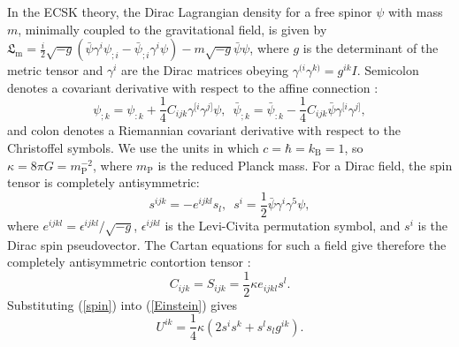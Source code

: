 \documentclass[prd,onecolumn,nofootinbib,showpacs]{revtex4}
\begin{document}
In the ECSK theory, the Dirac Lagrangian density for a free spinor $\psi$ with mass $m$, minimally coupled to the gravitational field, is given by $\mathfrak{L}_\textrm{m}=\frac{i}{2}\sqrt{-g}(\bar{\psi}\gamma^i\psi_{;i}-\bar{\psi}_{;i}\gamma^i\psi)-m\sqrt{-g}\bar{\psi}\psi$, where $g$ is the determinant of the metric tensor and $\gamma^i$ are the Dirac matrices obeying $\gamma^{(i}\gamma^{k)}=g^{ik}I$.
Semicolon denotes a covariant derivative with respect to the affine connection \cite{KS,Hehl}:
\begin{equation}
\psi_{;k}=\psi_{:k}+\frac{1}{4}C_{ijk}\gamma^{[i}\gamma^{j]}\psi,\,\,\,\bar{\psi}_{;k}=\bar{\psi}_{:k}-\frac{1}{4}C_{ijk}\bar{\psi}\gamma^{[i}\gamma^{j]},
\label{covariant}
\end{equation}
and colon denotes a Riemannian covariant derivative with respect to the Christoffel symbols.
We use the units in which $c=\hbar=k_\textrm{B}=1$, so $\kappa=8\pi G=m^{-2}_{\textrm{P}}$, where $m_{\textrm{P}}$ is the reduced Planck mass.
For a Dirac field, the spin tensor is completely antisymmetric:
\begin{equation}
s^{ijk}=-e^{ijkl}s_l,\,\,\,s^i=\frac{1}{2}\bar{\psi}\gamma^i\gamma^5\psi,
\label{spin}
\end{equation}
where $e^{ijkl}=\epsilon^{ijkl}/\sqrt{-g}$, $\epsilon^{ijkl}$ is the Levi-Civita permutation symbol, and $s^i$ is the Dirac spin pseudovector.
The Cartan equations for such a field give therefore the completely antisymmetric contortion tensor \cite{KS}:
\begin{equation}
C_{ijk}=S_{ijk}=\frac{1}{2}\kappa e_{ijkl}s^l.
\label{torsion}
\end{equation}
Substituting (\ref{spin}) into (\ref{Einstein}) gives
\begin{equation}
U^{ik}=\frac{1}{4}\kappa(2s^i s^k+s^l s_l g^{ik}).
\label{first}
\end{equation}
\end{document}
